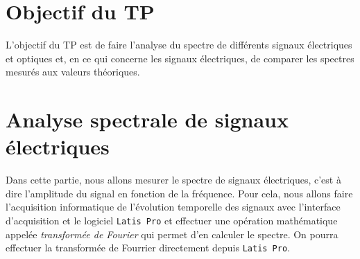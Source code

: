 \documentclass{tp}
\begin{document}
\section{Objectif du TP}
L'objectif du TP est de faire l'analyse du spectre de différents signaux électriques et optiques et, en ce qui concerne les signaux électriques, de comparer les spectres mesurés aux valeurs théoriques.


\section{Analyse spectrale de signaux électriques}%
\label{sec:analyse_spectrale_de_signaux_electriques}

Dans cette partie, nous allons mesurer le spectre de signaux électriques, c'est à dire l'amplitude du signal en fonction de la fréquence. Pour cela, nous allons faire l'acquisition informatique de l'évolution temporelle des signaux avec l'interface d'acquisition et le logiciel \texttt{Latis Pro} et effectuer une opération mathématique appelée \emph{transformée de Fourier} qui permet d'en calculer le spectre. On pourra effectuer la transformée de Fourrier directement depuis \texttt{Latis Pro}. 
\end{document}
